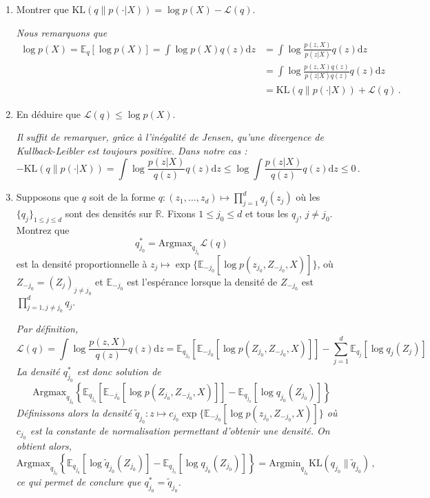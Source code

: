 \documentclass[a4paper,10pt,fleqn]{article}
\newcommand{\rset}{\ensuremath{\mathbb{R}}}
\newcommand{\1}{\ensuremath{\mathbbm{1}}}
\begin{document}
\begin{enumerate}
\item Montrer que $\mathrm{KL}(q\|p(\cdot|X)) = \log p(X) - \mathcal{L}(q) $.

\vspace{.2cm}

{\em
Nous remarquons que 
\begin{align*}
\log p(X) =\mathbb{E}_q\left[\log p(X)\right] = \int \log p(X) q(z) \mathrm{d} z &= \int \log \frac{p(z,X)}{p(z|X)} q(z) \mathrm{d} z\\
&  = \int \log \frac{p(z,X)q(z)}{p(z|X)q(z)} q(z) \mathrm{d} z\\
&= \mathrm{KL}(q\|p(\cdot|X)) + \mathcal{L}(q)  \,.
\end{align*}
}
\item En d\'eduire que $\mathcal{L}(q) \leq \log p(X)$.

\vspace{.2cm}

{\em
Il suffit de remarquer, gr\^ace \`a l'in\'egalit\'e de Jensen, qu'une divergence de Kullback-Leibler est toujours positive. Dans notre cas :
$$
-\mathrm{KL}(q\|p(\cdot|X))  =  \int \log \frac{p(z|X)}{q(z)} q(z) \mathrm{d} z \leq  \log \int \frac{p(z|X)}{q(z)} q(z) \mathrm{d} z \leq 0\,.
$$
}
\item Supposons que $q$ soit de la forme $q:(z_1,\ldots,z_d)\mapsto \prod_{j=1}^dq_j(z_j)$ o\`u les $\{q_j\}_{1\leq j\leq d}$ sont des densit\'es sur $\rset$. Fixons $1\leq j_0 \leq d$ et tous les $q_j$, $j\neq j_0$. Montrez que 
$$
q_{j_0}^* = \mathrm{Argmax}_{q_{j_0}} \mathcal{L}(q) 
$$
est la densit\'e proportionnelle \`a $z_j \mapsto \exp\{\mathbb{E}_{-j_0}[\log p (z_{j_0},Z_{-j_0},X)]\}$, o\`u $Z_{-j_0} = (Z_j)_{j\neq j_0}$ et $\mathbb{E}_{-j_0}$ est l'esp\'erance lorsque la densit\'e de $Z_{-j_0}$ est $\prod_{j=1,j\neq j_0}^dq_j$.

\vspace{.2cm}

{\em
Par d\'efinition,
$$
\mathcal{L}(q)  = \int \log\frac{p(z,X)}{q(z)}q(z) \mathrm{d} z = \mathbb{E}_{q_{j_0}}\left[\mathbb{E}_{-j_0}\left[\log p(Z_{j_0},Z_{-j_0},X)\right]\right] - \sum_{j=1}^d\mathbb{E}_{q_j}\left[\log q_j(Z_j)\right]
$$
La densit\'e $q_{j_0}^*$ est donc solution de 
$$
\mathrm{Argmax}_{q_{j_0}} \left\{\mathbb{E}_{q_{j_0}}\left[\mathbb{E}_{-j_0}\left[\log p(Z_{j_0},Z_{-j_0},X)\right]\right] - \mathbb{E}_{q_{j_0}}\left[\log q_{j_0}(Z_{j_0})\right]\right\}
$$ 
D\'efinissons alors la densit\'e $\tilde q_{j_0}:z\mapsto c_{j_0}\exp\{\mathbb{E}_{-j_0}[\log p (z_{j_0},Z_{-j_0},X)]\}$ o\`u $c_{j_0}$ est la constante de normalisation permettant d'obtenir une densit\'e. On obtient alors,
$$
\mathrm{Argmax}_{q_{j_0}} \left\{\mathbb{E}_{q_{j_0}}\left[\log \tilde q_{j_0}(Z_{j_0})\right] - \mathbb{E}_{q_{j_0}}\left[\log q_{j_0}(Z_{j_0})\right]\right\} = \mathrm{Argmin}_{q_{j_0}} \mathrm{KL}(q_{j_0}\|\tilde q_{j_0})  \,,
$$ 
ce qui permet de conclure que $q_{j_0}^* = \tilde q_{j_0}$.
}


\end{enumerate}
\end{document}
